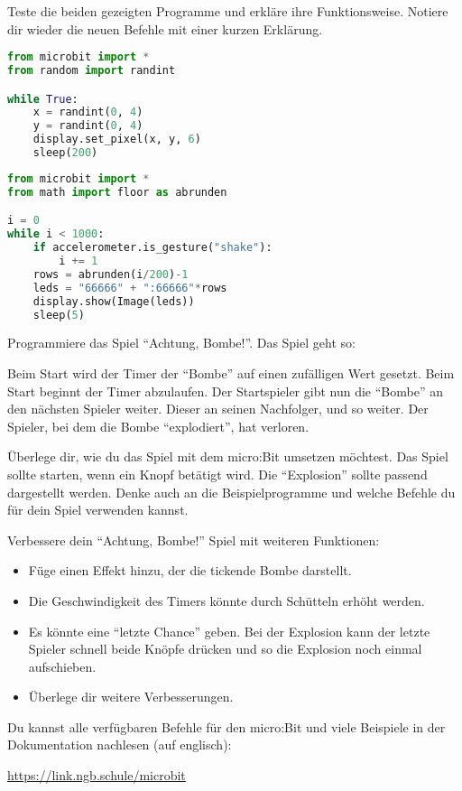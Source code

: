 \documentclass[10pt, a4paper]{scrartcl}
\begin{document}
\begin{aufgabe}[symbol=\symLaptop]
	Teste die beiden gezeigten Programme und erkläre ihre Funktionsweise. Notiere dir wieder die neuen Befehle mit einer kurzen Erklärung.
	\vspace{-1em}\setlength{\columnsep}{.8cm}
	\begin{multicols}{2}
	\begin{lstlisting}[language=Python]
from microbit import *
from random import randint

while True:
	x = randint(0, 4)
	y = randint(0, 4)
	display.set_pixel(x, y, 6)
	sleep(200)
	\end{lstlisting}
	
	\columnbreak
	
	\begin{lstlisting}[language=Python]
from microbit import *
from math import floor as abrunden

i = 0
while i < 1000:
    if accelerometer.is_gesture("shake"):
        i += 1
    rows = abrunden(i/200)-1
    leds = "66666" + ":66666"*rows
    display.show(Image(leds))
    sleep(5)
	\end{lstlisting}
	\end{multicols}
\end{aufgabe}

\begin{aufgabe}[symbol=\symLaptop]
	Programmiere das Spiel \enquote{Achtung, Bombe!}. Das Spiel geht so: 
	
	\begin{rahmen}
	Beim Start wird der Timer der \enquote{Bombe} auf einen zufälligen Wert gesetzt. Beim Start beginnt der Timer abzulaufen. Der Startspieler gibt nun die \enquote{Bombe} an den nächsten Spieler weiter. Dieser an seinen Nachfolger, und so weiter. Der Spieler, bei dem die Bombe \enquote{explodiert}, hat verloren.
	\end{rahmen}
	
	Überlege dir, wie du das Spiel mit dem micro:Bit umsetzen möchtest. Das Spiel sollte starten, wenn ein Knopf betätigt wird. Die \enquote{Explosion} sollte passend dargestellt werden. Denke auch an die Beispielprogramme und welche Befehle du für dein Spiel verwenden kannst.
\end{aufgabe}

\begin{aufgabe}[symbol=\symLaptop]
	Verbessere dein \enquote{Achtung, Bombe!} Spiel mit weiteren Funktionen:
	\begin{itemize}
		\item Füge einen Effekt hinzu, der die tickende Bombe darstellt.
		\item Die Geschwindigkeit des Timers könnte durch Schütteln erhöht werden.
		\item Es könnte eine \enquote{letzte Chance} geben. Bei der Explosion kann der letzte Spieler schnell beide Knöpfe drücken und so die Explosion noch einmal aufschieben.
		\item Überlege dir weitere Verbesserungen.
	\end{itemize}
\end{aufgabe}

\begin{infobox}
Du kannst alle verfügbaren Befehle für den micro:Bit und viele Beispiele in der Dokumentation nachlesen (auf englisch): 

\url{https://link.ngb.schule/microbit}
\end{infobox}
\end{document}
